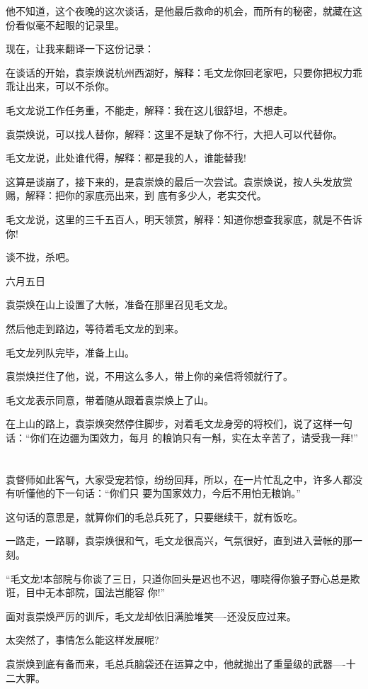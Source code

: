 \documentclass[11pt,a4paper,onecolumn]{article}
\begin{document}
他不知道，这个夜晚的这次谈话，是他最后救命的机会，而所有的秘密，就藏在这份看似毫不起眼的记录里。

现在，让我来翻译一下这份记录：

在谈话的开始，袁崇焕说杭州西湖好，解释：毛文龙你回老家吧，只要你把权力乖乖让出来，可以不杀你。

毛文龙说工作任务重，不能走，解释：我在这儿很舒坦，不想走。

袁崇焕说，可以找人替你，解释：这里不是缺了你不行，大把人可以代替你。

毛文龙说，此处谁代得，解释：都是我的人，谁能替我!

这算是谈崩了，接下来的，是袁崇焕的最后一次尝试。袁崇焕说，按人头发放赏赐，解释：把你的家底亮出来，到
底有多少人，老实交代。

毛文龙说，这里的三千五百人，明天领赏，解释：知道你想查我家底，就是不告诉你!

谈不拢，杀吧。

六月五日

袁崇焕在山上设置了大帐，准备在那里召见毛文龙。

然后他走到路边，等待着毛文龙的到来。

毛文龙列队完毕，准备上山。

袁崇焕拦住了他，说，不用这么多人，带上你的亲信将领就行了。

毛文龙表示同意，带着随从跟着袁崇焕上了山。

在上山的路上，袁崇焕突然停住脚步，对着毛文龙身旁的将校们，说了这样一句话：``你们在边疆为国效力，每月
的粮饷只有一斛，实在太辛苦了，请受我一拜!''

\section[\thesection]{}

袁督师如此客气，大家受宠若惊，纷纷回拜，所以，在一片忙乱之中，许多人都没有听懂他的下一句话：``你们只
要为国家效力，今后不用怕无粮饷。''

这句话的意思是，就算你们的毛总兵死了，只要继续干，就有饭吃。

一路走，一路聊，袁崇焕很和气，毛文龙很高兴，气氛很好，直到进入营帐的那一刻。

``毛文龙!本部院与你谈了三日，只道你回头是迟也不迟，哪晓得你狼子野心总是欺诳，目中无本部院，国法岂能容
你!''

面对袁崇焕严厉的训斥，毛文龙却依旧满脸堆笑----还没反应过来。

太突然了，事情怎么能这样发展呢?

袁崇焕到底有备而来，毛总兵脑袋还在运算之中，他就抛出了重量级的武器----十二大罪。
\end{document}

